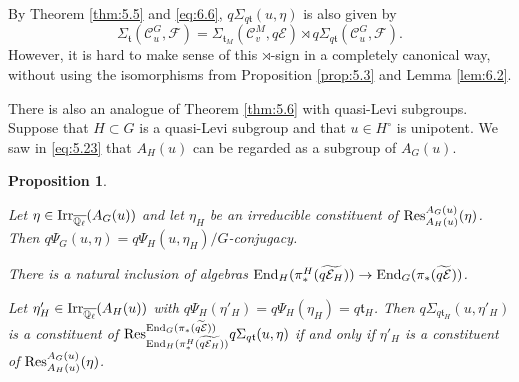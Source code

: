 \documentclass[11pt]{amsart}
\newtheorem{prop}[thm]{Proposition}
\theoremstyle{definition}
\newcommand{\enuma}[1]{\begin{enumerate}[\textup{(}a\textup{)}] {#1} \end{enumerate}}
\newcommand{\Q}{\mathbb Q}
\def\End{{\rm End}}
\def\Irr{{\rm Irr}}
\def\cC{{\mathcal C}}
\def\cE{{\mathcal E}}
\def\cF{{\mathcal F}}
\def\ft{{\mathfrak t}}
\def\Res{{\rm Res}}
\begin{document}
By Theorem \ref{thm:5.5} and \eqref{eq:6.6}, $q\Sigma_{q \ft}(u,\eta)$ is also given by
\begin{equation}\label{eq:6.13}
\Sigma_\ft (\cC_u^G,\cF) = 
\Sigma_{\ft_M}(\cC_v^M,q \cE) \rtimes q\Sigma_{q \ft}(\cC_u^G,\cF) .
\end{equation}
However, it is hard to make sense of this $\rtimes$-sign in a completely canonical way,
without using the isomorphisms from Proposition \ref{prop:5.3} and Lemma \ref{lem:6.2}.

There is also an analogue of Theorem \ref{thm:5.6} with quasi-Levi subgroups.
Suppose that $H \subset G$ is a quasi-Levi subgroup and that $u \in H^\circ$ is
unipotent. We saw in \eqref{eq:5.23} that $A_H (u)$ can be regarded as a subgroup
of $A_G (u)$.

\begin{prop}\label{prop:6.4}
\enuma{
\item Let $\eta \in \Irr_{\overline{\Q_{\ell}}}(A_G (u))$ and let $\eta_H$ be an irreducible
constituent of $\Res^{A_G (u)}_{A_H (u)}(\eta)$. Then 
$q \Psi_G (u,\eta) = q \Psi_H (u,\eta_H) / G$-conjugacy.
\item There is a natural inclusion of algebras $\End_H (\pi_*^H (\widetilde{q \cE_H})) \to
\End_G (\pi_* (\widetilde{q \cE}))$.

Let $\eta'_H \in \Irr_{\overline{\Q_{\ell}}}(A_H (u))$ with $q \Psi_H (\eta'_H) =
q \Psi_H (\eta_H) = q \ft_H$. Then $q \Sigma_{q \ft_H}(u,\eta'_H)$ is a constituent of
$\Res_{\End_H (\pi_*^H (\widetilde{q \cE_H}))}^{\End_G (\pi_* (\widetilde{q \cE}))} 
q \Sigma_{q \ft}(u,\eta)$ if and only if $\eta'_H$ is a constituent of 
$\Res^{A_G (u)}_{A_H (u)}(\eta)$.
}
\end{prop}
\end{document}
